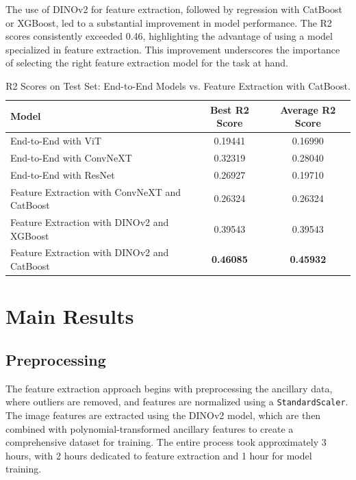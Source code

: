 \documentclass{article}
\begin{document}
The use of DINOv2 for feature extraction, followed by regression with CatBoost or XGBoost, led to a substantial improvement in model performance. The R2 scores consistently exceeded 0.46, highlighting the advantage of using a model specialized in feature extraction. This improvement underscores the importance of selecting the right feature extraction model for the task at hand.

\begin{table}[h]
	\centering
	\caption{R2 Scores on Test Set: End-to-End Models vs. Feature Extraction with CatBoost.}
	\begin{tabular}{lcc}
		\toprule
		Model                                         & Best R2 Score    & Average R2 Score \\
		\midrule
		End-to-End with ViT                           & 0.19441          & 0.16990          \\
		End-to-End with ConvNeXT                      & 0.32319          & 0.28040          \\
		End-to-End with ResNet                        & 0.26927          & 0.19710          \\
		Feature Extraction with ConvNeXT and CatBoost & 0.26324          & 0.26324          \\
		Feature Extraction with DINOv2 and XGBoost    & 0.39543          & 0.39543          \\
		Feature Extraction with DINOv2 and CatBoost   & \textbf{0.46085} & \textbf{0.45932} \\
		\bottomrule
	\end{tabular}
	\label{tab:r2-comparison}
\end{table}


\section{Main Results}
\subsection{Preprocessing}
The feature extraction approach begins with preprocessing the ancillary data, where outliers are removed, and features are normalized using a \texttt{StandardScaler}. The image features are extracted using the DINOv2 model, which are then combined with polynomial-transformed ancillary features to create a comprehensive dataset for training. The entire process took approximately 3 hours, with 2 hours dedicated to feature extraction and 1 hour for model training.
\end{document}
